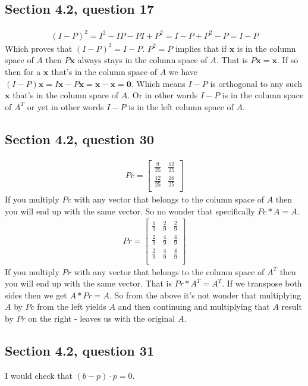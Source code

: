 \documentclass[a4paper,11pt]{article}
\newcommand{\mybf}[1]{\boldsymbol{#1}}
\begin{document}
\subsection*{Section 4.2, question 17}
\begin{align*}
(I-P)^2=I^2-IP-PI+P^2=I-P+P^2-P=I-P
\end{align*}
Which proves that $(I-P)^2=I-P$.
$P^2=P$ implies that if $\mybf{x}$ is in the column space of $A$ then $P\mybf{x}$ always stays in the column space of $A$. That is $P\mybf{x}=\mybf{x}$. If so then for a $\mybf{x}$ that's in the column space of $A$ we have $(I-P)\mybf{x}=I\mybf{x}-P\mybf{x}=\mybf{x}-\mybf{x}=\mybf{0}$. Which means $I-P$ is orthogonal to any such $\mybf{x}$ that's in the column space of $A$. Or in other words $I-P$ is in the column space of $A^T$ or yet in other words $I-P$ is in the left column space of $A$.
\subsection*{Section 4.2, question 30}
\begin{align*}
Pc=
\begin{bmatrix}
\frac{9}{25} & \frac{12}{25} \\
\frac{12}{25} & \frac{16}{25} \\
\end{bmatrix}
\end{align*}
If you multiply $Pc$ with any vector that belongs to the column space of $A$ then you will end up with the same vector. So no wonder that specifically $Pc*A=A$.
\begin{align*}
Pr=
\begin{bmatrix}
\frac{1}{9} & \frac{2}{9} & \frac{2}{9}\\
\frac{2}{9} & \frac{4}{9} & \frac{4}{9}\\
\frac{2}{9} & \frac{4}{9} & \frac{4}{9}\\
\end{bmatrix}
\end{align*}
If you multiply $Pr$ with any vector that belongs to the column space of $A^T$ then you will end up with the same vector. That is $Pr*A^T=A^T$. If we transpose both sides then we get $A*Pr=A$.
So from the above it's not wonder that multiplying $A$ by $Pc$ from the left yields $A$ and then continuing and multiplying that $A$ result by $Pr$ on the right - leaves us with the original $A$.
\subsection*{Section 4.2, question 31}
I would check that $(b-p) \cdot p = 0$.
\end{document}
